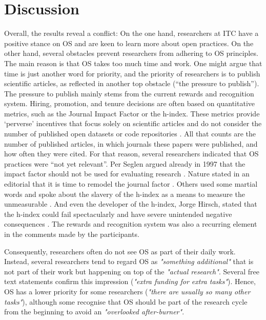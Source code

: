 \documentclass[gc, manuscript]{copernicus}
\begin{document}
\section{Discussion}

Overall, the results reveal a conflict: On the one hand, researchers at
ITC have a positive stance on OS and are keen to learn more about open
practices. On the other hand, several obstacles prevent researchers from
adhering to OS principles. The main reason is that OS takes too much
time and work. One might argue that time is just another word for
priority, and the priority of researchers is to publish scientific
articles, as reflected in another top obstacle (``the pressure to
publish''). The pressure to publish mainly stems from the current
rewards and recognition system. Hiring, promotion, and tenure decisions
are often based on quantitative metrics, such as the Journal Impact
Factor or the h-index. These metrics provide `perverse' incentives that
focus solely on scientific articles and do not consider the number of
published open datasets or code repositories \citep{bouter2020research}.
All that counts are the number of published articles, in which journals
these papers were published, and how often they were cited. For that
reason, several researchers indicated that OS practices were ``not yet
relevant''. Per Seglen argued already in 1997 that the impact factor
should not be used for evaluating research \citep{seglen1997impact}.
Nature stated in an editorial that it is time to remodel the journal
factor \citep{natureedit2016}. Others used some martial words and spoke
about the slavery of the h-index as a means to measure the unmeasurable
\citep{Kreiner_2016}. And even the developer of the h-index, Jorge
Hirsch, stated that the h-index could fail spectacularly and have severe
unintended negative consequences \citep{conroy2020s}. The rewards and
recognition system was also a recurring element in the comments made by
the participants.

Consequently, researchers often do not see OS as part of their daily
work. Instead, several researchers tend to regard OS as
\textit{"something additional"} that is not part of their work but
happening on top of the \textit{"actual research"}. Several free text
statements confirm this impression
(\textit{"extra funding for extra tasks"}). Hence, OS has a lower
priority for some researchers
(\textit{"there are usually so many other tasks"}), although some
recognise that OS should be part of the research cycle from the
beginning to avoid an \textit{"overlooked after-burner"}.
\end{document}
